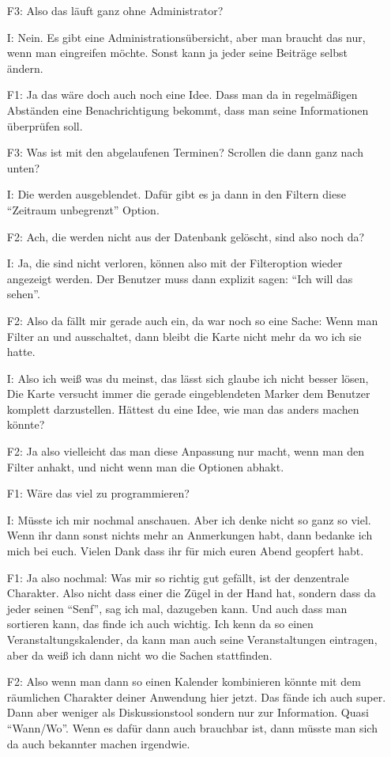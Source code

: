 \begin{itemize}
    \item[F3:] Also das läuft ganz ohne Administrator?
    \item[I:] Nein. Es gibt eine Administrationsübersicht, aber man braucht das nur, wenn man eingreifen möchte. Sonst kann ja jeder seine Beiträge selbst ändern.
    \item[F1:] Ja das wäre doch auch noch eine Idee. Dass man da in regelmäßigen Abständen eine Benachrichtigung bekommt, dass man seine Informationen überprüfen soll.
    \item[F3:] Was ist mit den abgelaufenen Terminen? Scrollen die dann ganz nach unten?
    \item[I:] Die werden ausgeblendet. Dafür gibt es ja dann in den Filtern diese "`Zeitraum unbegrenzt"' Option.
    \item[F2:] Ach, die werden nicht aus der Datenbank gelöscht, sind also noch da?
    \item[I:] Ja, die sind nicht verloren, können also mit der Filteroption wieder angezeigt werden. Der Benutzer muss dann explizit sagen: "`Ich will das sehen"'.
    \item[F2:] Also da fällt mir gerade auch ein, da war noch so eine Sache: Wenn man Filter an und ausschaltet, dann bleibt die Karte nicht mehr da wo ich sie hatte.
    \item[I:] Also ich weiß was du meinst, das lässt sich glaube ich nicht besser lösen, Die Karte versucht immer die gerade eingeblendeten Marker dem Benutzer komplett darzustellen. Hättest du eine Idee, wie man das anders machen könnte?
    \item[F2:] Ja also vielleicht das man diese Anpassung nur macht, wenn man den Filter anhakt, und nicht wenn man die Optionen abhakt.
    \item[F1:] Wäre das viel zu programmieren?
    \item[I:] Müsste ich mir nochmal anschauen. Aber ich denke nicht so ganz so viel. Wenn ihr dann sonst nichts mehr an Anmerkungen habt, dann bedanke ich mich bei euch. Vielen Dank dass ihr für mich euren Abend geopfert habt.
    \item[F1:] Ja also nochmal: Was mir so richtig gut gefällt, ist der denzentrale Charakter. Also nicht dass einer die Zügel in der Hand hat, sondern dass da jeder seinen "`Senf"', sag ich mal, dazugeben kann. Und auch dass man sortieren kann, das finde ich auch wichtig. Ich kenn da so einen Veranstaltungskalender, da kann man auch seine Veranstaltungen eintragen, aber da weiß ich dann nicht wo die Sachen stattfinden.
    \item[F2:] Also wenn man dann so einen Kalender kombinieren könnte mit dem räumlichen Charakter deiner Anwendung hier jetzt. Das fände ich auch super. Dann aber weniger als Diskussionstool sondern nur zur Information. Quasi "`Wann/Wo"'. Wenn es dafür dann auch brauchbar ist, dann müsste man sich da auch bekannter machen irgendwie.

\end{itemize}
